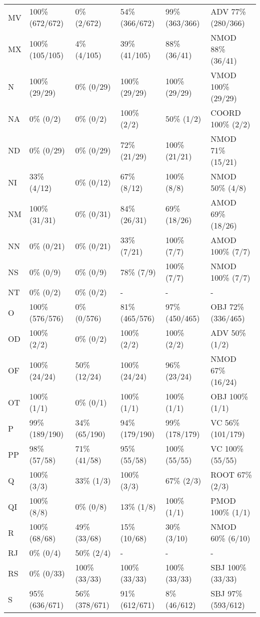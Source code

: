 \begin{small}
\begin{longtable}{|l|l|l|l|l|l|}
MV & 100\% (672/672) & 0\% (2/672) & 54\% (366/672) & 99\% (363/366) & ADV 77\% (280/366) \\ 
MX & 100\% (105/105) & 4\% (4/105) & 39\% (41/105) & 88\% (36/41) & NMOD 88\% (36/41) \\ 
N & 100\% (29/29) & 0\% (0/29) & 100\% (29/29) & 100\% (29/29) & VMOD 100\% (29/29) \\ 
NA & 0\% (0/2) & 0\% (0/2) & 100\% (2/2) & 50\% (1/2) & COORD 100\% (2/2) \\ 
ND & 0\% (0/29) & 0\% (0/29) & 72\% (21/29) & 100\% (21/21) & NMOD 71\% (15/21) \\ 
NI & 33\% (4/12) & 0\% (0/12) & 67\% (8/12) & 100\% (8/8) & NMOD 50\% (4/8) \\ 
NM & 100\% (31/31) & 0\% (0/31) & 84\% (26/31) & 69\% (18/26) & AMOD 69\% (18/26) \\ 
NN & 0\% (0/21) & 0\% (0/21) & 33\% (7/21) & 100\% (7/7) & AMOD 100\% (7/7) \\ 
NS & 0\% (0/9) & 0\% (0/9) & 78\% (7/9) & 100\% (7/7) & NMOD 100\% (7/7) \\ 
NT & 0\% (0/2) & 0\% (0/2) & - & - & - \\ 
O & 100\% (576/576) & 0\% (0/576) & 81\% (465/576) & 97\% (450/465) & OBJ 72\% (336/465) \\ 
OD & 100\% (2/2) & 0\% (0/2) & 100\% (2/2) & 100\% (2/2) & ADV 50\% (1/2) \\ 
OF & 100\% (24/24) & 50\% (12/24) & 100\% (24/24) & 96\% (23/24) & NMOD 67\% (16/24) \\ 
OT & 100\% (1/1) & 0\% (0/1) & 100\% (1/1) & 100\% (1/1) & OBJ 100\% (1/1) \\ 
P & 99\% (189/190) & 34\% (65/190) & 94\% (179/190) & 99\% (178/179) & VC 56\% (101/179) \\ 
PP & 98\% (57/58) & 71\% (41/58) & 95\% (55/58) & 100\% (55/55) & VC 100\% (55/55) \\ 
Q & 100\% (3/3) & 33\% (1/3) & 100\% (3/3) & 67\% (2/3) & ROOT 67\% (2/3) \\ 
QI & 100\% (8/8) & 0\% (0/8) & 13\% (1/8) & 100\% (1/1) & PMOD 100\% (1/1) \\ 
R & 100\% (68/68) & 49\% (33/68) & 15\% (10/68) & 30\% (3/10) & NMOD 60\% (6/10) \\ 
RJ & 0\% (0/4) & 50\% (2/4) & - & - & - \\ 
RS & 0\% (0/33) & 100\% (33/33) & 100\% (33/33) & 100\% (33/33) & SBJ 100\% (33/33) \\ 
S & 95\% (636/671) & 56\% (378/671) & 91\% (612/671) & 8\% (46/612) & SBJ 97\% (593/612) \\ 

\end{longtable}
\end{small}
